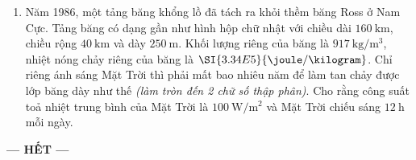 \begin{enumerate}[label=\bfseries Câu \arabic*:, leftmargin=1.7cm]
\item Năm 1986, một tảng băng khổng lồ đã tách ra khỏi thềm băng Ross ở Nam Cực. Tảng băng có dạng gần như hình hộp chữ nhật với chiều dài $\SI{160}{\kilo\meter}$, chiều rộng $\SI{40}{\kilo\meter}$ và dày $\SI{250}{\meter}$. Khối lượng riêng của băng là $\SI{917}{\kilogram/\meter^3}$, nhiệt nóng chảy riêng của băng là $\SI{3.34E5}{\joule/\kilogram}$. Chỉ riêng ánh sáng Mặt Trời thì phải mất bao nhiêu năm để làm tan chảy được lớp băng dày như thế \textit{(làm tròn đến 2 chữ số thập phân)}. Cho rằng công suất toả nhiệt trung bình của Mặt Trời là $\SI{100}{\watt/\meter^2}$ và Mặt Trời chiếu sáng $\SI{12}{\hour}$ mỗi ngày.
\end{enumerate}
\begin{center}
	\textbf{--- HẾT ---}
\end{center}
